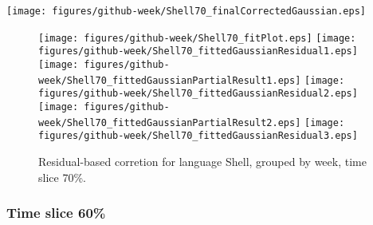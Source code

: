 \begin{center}
{\texttt{[image: figures/github-week/Shell70\_finalCorrectedGaussian.eps]}}
\end{center}

\FloatBarrier

\begin{figure}[t]
\centering
{}
{\texttt{[image: figures/github-week/Shell70\_fitPlot.eps]}}
{\texttt{[image: figures/github-week/Shell70\_fittedGaussianResidual1.eps]}}
{\texttt{[image: figures/github-week/Shell70\_fittedGaussianPartialResult1.eps]}}
{\texttt{[image: figures/github-week/Shell70\_fittedGaussianResidual2.eps]}}
{\texttt{[image: figures/github-week/Shell70\_fittedGaussianPartialResult2.eps]}}
{\texttt{[image: figures/github-week/Shell70\_fittedGaussianResidual3.eps]}}
\caption{Residual-based corretion for language Shell, grouped by week, time slice 70\%.}
\end{figure}


\FloatBarrier


\subsubsection{Time slice 60\%}

